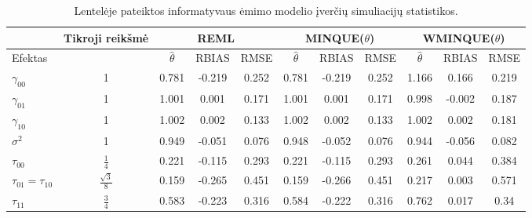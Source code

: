 \documentclass[12pt,a4paper]{article}
\begin{document}
\begin{sidewaystable}
\label{table:wminquerez}
\renewcommand{\arraystretch}{1.5}%
\centering
\begin{tabular}{|l|c|ccc|ccc|ccc|}
\hline
& \multicolumn{1}{m{2cm}|}{Tikroji reikšmė}& \multicolumn{3}{c|}{REML}&\multicolumn{3}{c|}{MINQUE($\theta$)}&\multicolumn{3}{c|}{WMINQUE($\theta$)}\\
  \hline
Efektas & & $\hat{\theta}$ & RBIAS & RMSE & $\hat{\theta}$ & RBIAS & RMSE& $\hat{\theta}$ & RBIAS & RMSE  \\ 
  \hline
$\gamma_{00}$ & 1 & 0.781 & -0.219 & 0.252 & 0.781 & -0.219 & 0.252 & 1.166 & 0.166 & 0.219 \\ 
 $\gamma_{01}$ & 1 & 1.001 & 0.001 & 0.171 & 1.001 & 0.001 & 0.171 & 0.998 & -0.002 & 0.187 \\ 
 $\gamma_{10}$ & 1 & 1.002 & 0.002 & 0.133 & 1.002 & 0.002 & 0.133 & 1.002 & 0.002 & 0.181 \\ 
 $\sigma^2$ & 1 & 0.949 & -0.051 & 0.076 & 0.948 & -0.052 & 0.076 & 0.944 & -0.056 & 0.082 \\ 
$ \tau_{00}$ & $\frac{1}{4}$ & 0.221 & -0.115 & 0.293 & 0.221 & -0.115 & 0.293 & 0.261 & 0.044 & 0.384 \\ 
$ \tau_{01} =  \tau_{10}$ &$ \frac{\sqrt{3}}{8}$ & 0.159 & -0.265 & 0.451 & 0.159 & -0.266 & 0.451 & 0.217 & 0.003 & 0.571 \\ 
  $ \tau_{11}$ & $\frac{3}{4}$ & 0.583 & -0.223 & 0.316 & 0.584 & -0.222 & 0.316 & 0.762 & 0.017 & 0.34 \\ 
   \hline
\end{tabular}
\caption{Lentelėje pateiktos informatyvaus ėmimo modelio įverčių simuliacijų statistikos.}
\end{sidewaystable}
\end{document}
